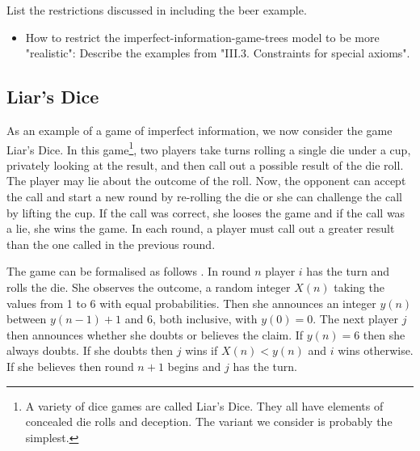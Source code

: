 { \color{red} List the restrictions discussed in \cite{benthem2001a} including the beer example. }



\begin{itemize} \color{red}
\item How to restrict the imperfect-information-game-trees model to be more "realistic": Describe the examples from "III.3. Constraints for special axioms".
\end{itemize}

\subsection{Liar's Dice}

As an example of a game of imperfect information, we now consider the game Liar's Dice. In this game\footnote{A variety of dice games are called Liar's Dice. They all have elements of concealed die rolls and deception. The variant we consider is probably the simplest.}, two players take turns rolling a single die under a cup, privately looking at the result, and then call out a possible result of the die roll. The player may lie about the outcome of the roll. Now, the opponent can accept the call and start a new round by re-rolling the die or she can challenge the call by lifting the cup. If the call was correct, she looses the game and if the call was a lie, she wins the game. In each round, a player must call out a greater result than the one called in the previous round.

The game can be formalised as follows \cite{ferguson1991}. In round $n$ player $i$ has the turn and rolls the die. She observes the outcome, a random integer $X(n)$ taking the values from 1 to 6 with equal probabilities. Then she announces an integer $y(n)$ between $y(n-1)+1$ and 6, both inclusive, with $y(0) = 0$. The next player $j$ then announces whether she doubts or believes the claim. If $y(n)=6$ then she always doubts. If she doubts then $j$ wins if $X(n) < y(n)$ and $i$ wins otherwise. If she believes then round $n+1$ begins and $j$ has the turn.

